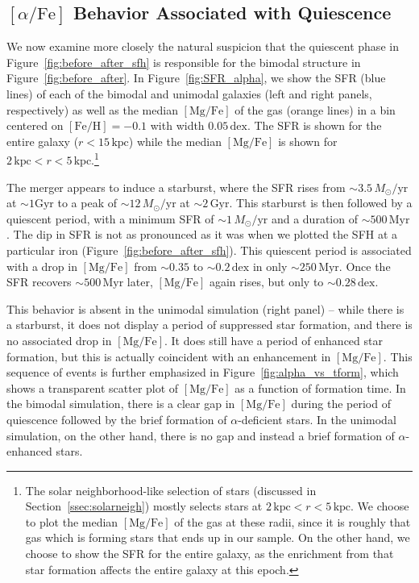 \documentclass[twocolumn,linenumbers,trackchanges]{aastex631}
\newcommand{\Msun}{\ensuremath{M_{\odot}}}
\newcommand{\Gyr}{\ensuremath{\textrm{Gyr}}}
\newcommand{\Myr}{\ensuremath{\textrm{Myr}}}
\newcommand{\kpc}{\ensuremath{\textrm{kpc}}}
\newcommand{\FeH}{\ensuremath{[\textrm{Fe}/\textrm{H}]}}
\newcommand{\MgFe}{\ensuremath{[\textrm{Mg}/\textrm{Fe}]}}
\newcommand{\alphaFe}{\ensuremath{[\alpha/\textrm{Fe}]}}
\newcommand{\dex}{\ensuremath{\textrm{dex}}}
\newcommand{\Msunyr}{\ensuremath{\Msun/\textrm{yr}}}
\begin{document}
\subsection{\alphaFe{} Behavior Associated with Quiescence}
We now examine more closely the natural suspicion that the quiescent phase in Figure~\ref{fig:before_after_sfh} is responsible for the bimodal structure in Figure~\ref{fig:before_after}. In Figure~\ref{fig:SFR_alpha}, we show the SFR (blue lines) of each of the bimodal and unimodal galaxies (left and right panels, respectively) as well as the median \MgFe{} of the gas (orange lines) in a bin centered on $\FeH{}=-0.1$ with width $0.05\,\dex$. The SFR is shown for the entire galaxy ($r<15\,\kpc$) while the median \MgFe{} is shown for $2\,\kpc<r<5\,\kpc$.\footnote{The solar neighborhood-like selection of stars (discussed in Section~\ref{ssec:solarneigh}) mostly selects stars at $2\,\kpc<r<5\,\kpc$. We choose to plot the median \MgFe{} of the gas at these radii, since it is roughly that gas which is forming stars that ends up in our sample. On the other hand, we choose to show the SFR for the entire galaxy, as the enrichment from that star formation affects the entire galaxy at this epoch.}

The merger appears to induce a starburst, where the SFR rises from $\sim3.5\,\Msunyr$ at $\sim1\Gyr$ to a peak of $\sim12\,\Msunyr$ at $\sim2\,\Gyr$. This starburst is then followed by a quiescent period, with a minimum SFR of $\sim1\,\Msunyr$ and a duration of $\sim500\,\Myr$. The dip in SFR is not as pronounced as it was when we plotted the SFH at a particular iron (Figure~\ref{fig:before_after_sfh}). This quiescent period is associated with a drop in \MgFe{} from $\sim0.35$ to $\sim0.2\,\dex$ in only $\sim250\,\Myr$. Once the SFR recovers $\sim500\,\Myr$ later, \MgFe{} again rises, but only to $\sim0.28\,\dex$.

This behavior is absent in the unimodal simulation (right panel) -- while there is a starburst, it does not display a period of suppressed star formation, and there is no associated drop in \MgFe{}. It does still have a period of enhanced star formation, but this is actually coincident with an enhancement in \MgFe{}. This sequence of events is further emphasized in Figure~\ref{fig:alpha_vs_tform}, which shows a transparent scatter plot of \MgFe{} as a function of formation time. In the bimodal simulation, there is a clear gap in \MgFe{} during the period of quiescence followed by the brief formation of $\alpha$-deficient stars. In the unimodal simulation, on the other hand, there is no gap and instead a brief formation of $\alpha$-enhanced stars.
\end{document}
